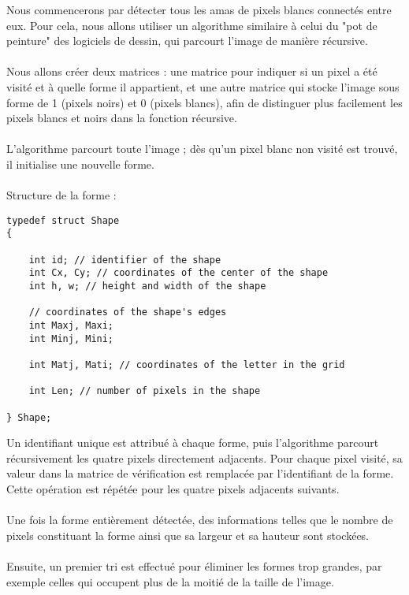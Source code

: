 \documentclass{article}
\begin{document}
Nous commencerons par détecter tous les amas de pixels blancs connectés entre eux. Pour cela, nous allons utiliser un algorithme similaire à celui du "pot de peinture" des logiciels de dessin, qui parcourt l'image de manière récursive.
\\\\
Nous allons créer deux matrices : une matrice pour indiquer si un pixel a été visité et à quelle forme il appartient, et une autre matrice qui stocke l'image sous forme de 1 (pixels noirs) et 0 (pixels blancs), afin de distinguer plus facilement les pixels blancs et noirs dans la fonction récursive.
\\\\
L'algorithme parcourt toute l'image ; dès qu'un pixel blanc non visité est trouvé, il initialise une nouvelle forme.
\\\\
Structure de la forme :
\begin{lstlisting}
typedef struct Shape 
{

    int id; // identifier of the shape
    int Cx, Cy; // coordinates of the center of the shape
    int h, w; // height and width of the shape

    // coordinates of the shape's edges
    int Maxj, Maxi;
    int Minj, Mini;

    int Matj, Mati; // coordinates of the letter in the grid

    int Len; // number of pixels in the shape
  
} Shape;
\end{lstlisting}

\vspace{0.5cm}

Un identifiant unique est attribué à chaque forme, puis l'algorithme parcourt récursivement les quatre pixels directement adjacents. Pour chaque pixel visité, sa valeur dans la matrice de vérification est remplacée par l’identifiant de la forme. Cette opération est répétée pour les quatre pixels adjacents suivants.
\\\\
Une fois la forme entièrement détectée, des informations telles que le nombre de pixels constituant la forme ainsi que sa largeur et sa hauteur sont stockées.
\\\\
Ensuite, un premier tri est effectué pour éliminer les formes trop grandes, par exemple celles qui occupent plus de la moitié de la taille de l'image.
\\
\end{document}
